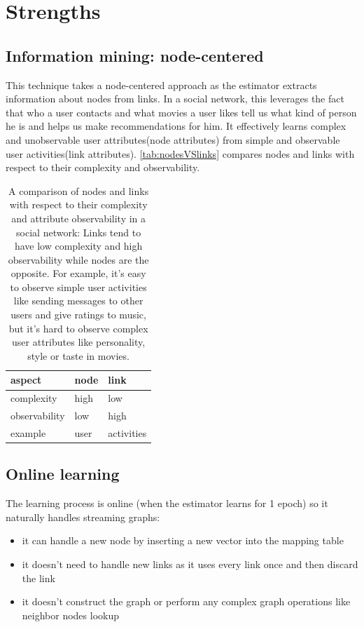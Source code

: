 \documentclass{article}
\begin{document}
\section{Strengths}

\subsection{Information mining: node-centered}
This technique takes a node-centered approach as the estimator extracts 
information about nodes from links.
In a social network, this leverages the fact that who a user contacts and what 
movies a user likes tell us what kind of person he is and helps us make 
recommendations for him.
It effectively learns complex and unobservable user attributes(node attributes) 
from simple and observable user activities(link attributes). 
\autoref{tab:nodesVSlinks} compares nodes and links with respect to their 
complexity and observability.
\begin{table}[h]
	\centering
	\begin{tabularx}{0.5\textwidth}{ |X|X|X| } \hline
		aspect  & node & link \\ \hline
		complexity & high & low \\ \hline
		observability & low & high \\ \hline
		example & user & activities \\ \hline
	\end{tabularx}
	\caption{A comparison of nodes and links with respect to their complexity 
		and attribute observability in a social network:
		Links tend to have low complexity and high observability while nodes 
		are the opposite.
		For example, it's easy to observe simple user activities like sending 
		messages to other users and give ratings to music,
		but it's hard to observe complex user attributes like personality, 
		style or taste in movies.}
	\label{tab:nodesVSlinks}
\end{table}

\subsection{Online learning}
The learning process is online (when the estimator learns for 1 epoch) so it 
naturally handles streaming graphs:
\begin{itemize}
	\item it can handle a new node by inserting a new vector into the mapping 
	table
	\item it doesn't need to handle new links as it uses every link once and 
	then discard the link
	\item it doesn't construct the graph or perform any complex graph 
	operations like neighbor nodes lookup
\end{itemize}
\end{document}
